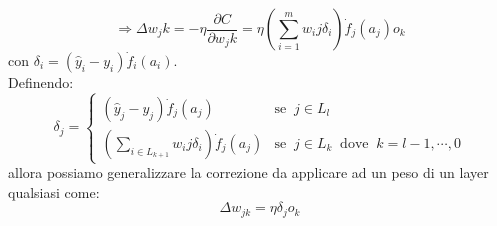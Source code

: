 \documentclass[a4paper,10pt]{article}
\begin{document}
\begin{equation}
 \Rightarrow \Delta w_jk = - \eta \frac{\partial C}{\partial w_jk} = \eta \left(\sum_{i=1}^m w_ij \delta_i \right) \dot{f}_j(a_j) o_k
\end{equation}
con $\delta_i = (\hat{y}_i - y_i) \dot{f}_i(a_i)$. \\
Definendo:
\begin{equation}
 \delta_j = \begin{cases}
                       (\hat{y}_j - y_j) \dot{f}_j(a_j) & \mbox{se} \;\; j \in L_l \\
                       \left( \sum_{i \in L_{k+1}} w_ij \delta_i \right) \dot{f}_j(a_j) & \mbox{se} \;\; j \in L_k \;\; \mbox{dove} \;\; k = l-1,\cdots,0
                      \end{cases}
\end{equation}
allora possiamo generalizzare la correzione da applicare ad un peso di un layer qualsiasi come:
\begin{equation}
 \Delta w_{jk} = \eta \delta_j o_k
\end{equation}
\end{document}
